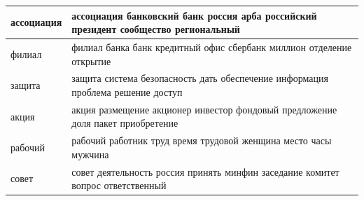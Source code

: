 \documentclass[a4paper, 14pt]{extarticle}
\begin{document}
\begin{landscape}
\begin{small}
\begin{singlespace}
\begin{table}[h]
\begin{tabular}{|l|l|}
				ассоциация &  ассоциация банковский банк россия арба российский президент сообщество региональный \\ \hline
				филиал &  филиал банка банк кредитный офис сбербанк миллион отделение открытие \\ \hline
				защита &  защита система безопасность дать обеспечение информация проблема решение доступ \\ \hline
				акция &  акция размещение акционер инвестор фондовый предложение доля пакет приобретение \\ \hline
				рабочий &  рабочий работник труд время трудовой женщина место часы мужчина \\ \hline
				совет &  совет деятельность россия принять минфин заседание комитет вопрос ответственный \\ \hline
				
		
				\end{tabular}
			\end{table}
		\end{singlespace}
	\end{small}
\end{landscape}
\end{document}
